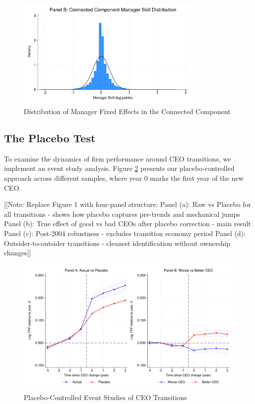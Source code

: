 \documentclass[11pt,a4paper]{article}
\begin{document}
\begin{figure}[htbp]
\centering
\includegraphics[width=0.8\textwidth]{figure/manager_skill_connected.pdf}
\caption{Distribution of Manager Fixed Effects in the Connected Component}
\label{fig:manager_distribution}
\end{figure}

\subsection{The Placebo Test}

To examine the dynamics of firm performance around CEO transitions, we implement an event study analysis. Figure \ref{fig:event_study_main} presents our placebo-controlled approach across different samples, where year 0 marks the first year of the new CEO.

[[Note: Replace Figure 1 with four-panel structure:
Panel (a): Raw vs Placebo for all transitions - shows how placebo captures pre-trends and mechanical jumps
Panel (b): True effect of good vs bad CEOs after placebo correction - main result
Panel (c): Post-2004 robustness - excludes transition economy period
Panel (d): Outsider-to-outsider transitions - cleanest identification without ownership changes]]

\begin{figure}[htbp]
\centering
\includegraphics[width=\textwidth]{figure/event_study.pdf}
\caption{Placebo-Controlled Event Studies of CEO Transitions}
\label{fig:event_study_main}
\end{figure}
\end{document}
